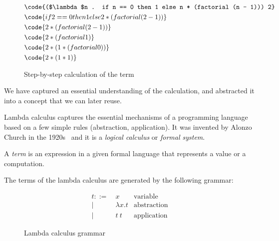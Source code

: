 \begin{figure}[H]
       \begin{equation*}
              \begin{aligned}
                     &\code{($\lambda$n . if n == 0 then 1 else n * (factorial (n - 1))) 2} \\
                     &\code{if 2 == 0 then 1 else 2 * (factorial (2 - 1))} \\
                     &\code{2 * (factorial (2 - 1))} \\
                     &\code{2 * (factorial 1)} \\
                     &\code{2 * (1 * (factorial 0))} \\
                     &\code{2 * (1 * 1)} 
              \end{aligned}
       \end{equation*}
       \caption{Step-by-step calculation of the  term}
       \label{fig:factorial-calc:step-1}
\end{figure}

We have captured an essential understanding of the calculation, and abstracted it into a concept that we can later reuse.

Lambda calculus captures the essential mechanisms of a programming language based on a few simple rules (abstraction, application). It was invented by Alonzo Church in the 1920s~\cite{tapl} and it is a \emph{logical calculus} or \emph{formal system}.

\begin{definition}[Term]
       A \emph{term} is an expression in a given formal language that represents a value or a computation.
\end{definition}

The terms of the lambda calculus are generated by the following grammar:

\begin{figure}[H]
       \begin{equation*}
              \begin{aligned}
                     t ::= & \ x            & \text{variable}    \\
                     |     & \  \lambda x.t & \text{abstraction} \\
                     |     & \  t\ t        & \text{application}
              \end{aligned}
       \end{equation*}
       \caption{Lambda calculus grammar}\label{fig:lambda-calc-grammar}
\end{figure}

